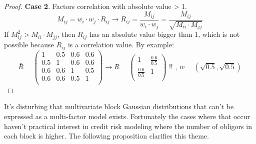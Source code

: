\documentclass[11pt,fleqn]{book} %
\begin{document}
\begin{proof}
	\textbf{Case 2}. Factors correlation with absolute value > 1.
	\begin{displaymath}
		M_{ij} = w_i \cdot w_j \cdot R_{ij} \longrightarrow 
		R_{ij} = \frac{M_{ij}}{w_i \cdot w_j} = 
		\frac{M_{ij}}{\sqrt{M_{ii} \cdot M_{jj}}}
	\end{displaymath}
	If $M_{ij}^2 > M_{ii} \cdot M_{jj}$, then $R_{ij}$ has an absolute value
	bigger than 1, which is not possible because $R_{ij}$ is a correlation
	value. By example:
	\begin{displaymath}
		\bar{R} = \left(
		\begin{array}{cc|cc}
			1   & 0.5 & 0.6 & 0.6 \\
			0.5 & 1   & 0.6 & 0.6 \\
			\hline
			0.6 & 0.6 & 1   & 0.5 \\
			0.6 & 0.6 & 0.5 & 1   \\
		\end{array}
		\right) 
		\longrightarrow
		R = \left(
		\begin{array}{cc}
			1               & \frac{0.6}{0.5} \\
			\frac{0.6}{0.5} & 1               \\
		\end{array}
		\right)
		\text{ !!}
		\text{ , }
		w = (\sqrt{0.5}, \sqrt{0.5})
	\end{displaymath}
\end{proof}

It's disturbing that multivariate block Gaussian distributions 
that can't be expressed as a multi-factor model exists. Fortunately the 
cases where that occur haven't practical interest in credit risk
modeling where the number of obligors in each block is higher. 
The following proposition clarifies this theme.
\end{document}
